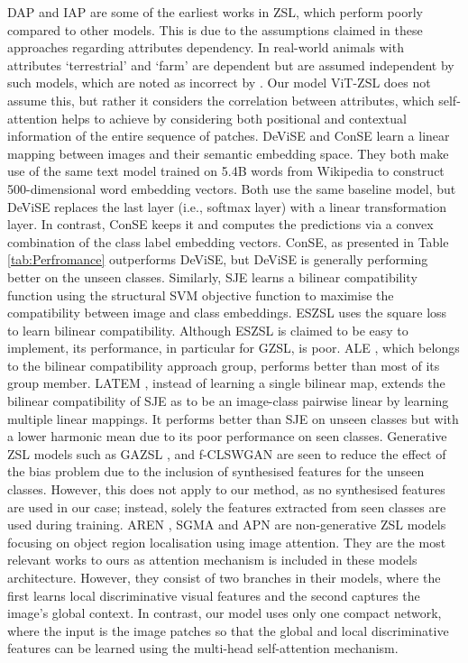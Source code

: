\documentclass[a4paper,11pt]{article}
\begin{document}
DAP and IAP \cite{5206594} are some of the earliest works in ZSL, which perform poorly compared to other models. This is due to the assumptions claimed in these approaches regarding attributes dependency. In real-world animals with attributes `terrestrial' and `farm' are dependent but are assumed independent by such models, which are noted as incorrect by \cite{ALE}. Our model ViT-ZSL does not assume this, but rather it considers the correlation between attributes, which self-attention helps to achieve by considering both positional and contextual information of the entire sequence of patches. DeViSE \cite{DeViSE} and ConSE \cite{ConSE} learn a linear mapping between images and their semantic embedding space. They both make use of the same text model trained on 5.4B words from Wikipedia to construct 500-dimensional word embedding vectors. Both use the same baseline model, but DeViSE replaces the last layer (i.e., softmax layer) with a linear transformation layer. In contrast, ConSE keeps it and computes the predictions via a convex combination of the class label embedding vectors. ConSE, as presented in Table \ref{tab:Perfromance} outperforms DeViSE, but DeViSE is generally performing better on the unseen classes. Similarly, SJE \cite{SJE} learns a bilinear compatibility function using the structural SVM objective function to maximise the compatibility between image and class embeddings. ESZSL \cite{romera-paredes15} uses the square loss to learn bilinear compatibility. Although ESZSL is claimed to be easy to implement, its performance, in particular for GZSL, is poor. ALE \cite{ALE}, which belongs to the bilinear compatibility approach group, performs better than most of its group member. LATEM \cite{LATEM}, instead of learning a single bilinear map, extends the bilinear compatibility of SJE \cite{SJE} as to be an image-class pairwise linear by learning multiple linear mappings. It performs better than SJE on unseen classes but with a lower harmonic mean due to its poor performance on seen classes. Generative ZSL models such as GAZSL \cite{GAZSL}, and f-CLSWGAN \cite{8578679} are seen to reduce the effect of the bias problem due to the inclusion of synthesised features for the unseen classes. However, this does not apply to our method, as no synthesised features are used in our case; instead, solely the features extracted from seen classes are used during training. AREN \cite{AREN}, SGMA \cite{SGMA} and APN \cite{APN} are non-generative ZSL models focusing on object region localisation using image attention. They are the most relevant works to ours as attention mechanism is included in these models architecture. However, they consist of two branches in their models, where the first learns local discriminative visual features and the second captures the image's global context. In contrast, our model uses only one compact network, where the input is the image patches so that the global and local discriminative features can be learned using the multi-head self-attention mechanism.
\end{document}
